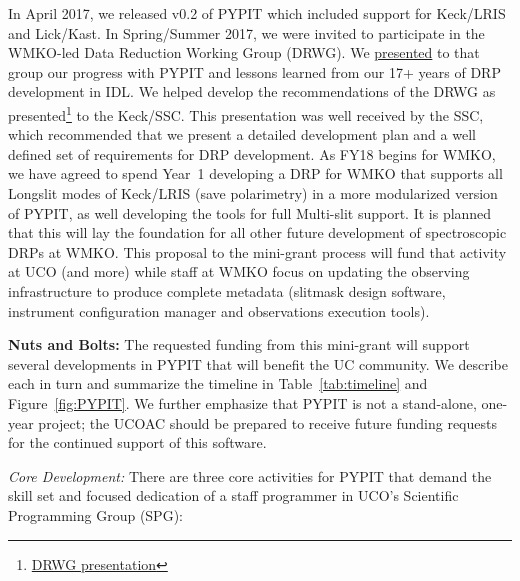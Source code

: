 \documentclass[12pt,preprint]{aastex}
\begin{document}
\noindent
In April 2017, we released v0.2 of PYPIT which included 
support for Keck/LRIS and Lick/Kast. 
In Spring/Summer 2017, we were invited to participate
in the WMKO-led Data Reduction Working Group (DRWG). We 
\href{https://www.dropbox.com/s/n17il1aah1xs6fx/ucsc_pypit_mar2017.pdf?dl=0}
{presented} to that group our progress with PYPIT and
lessons learned from our 17+ years of DRP development in 
IDL.%
We helped develop the recommendations of the DRWG as 
presented\footnote{\href{https://www.dropbox.com/s/k7ykp80voslaw7o/DRWG_June2017_SSC_v2.pptx?dl=0}{DRWG presentation}} 
to the Keck/SSC.  This presentation was well received by the
SSC, which recommended that we present a detailed development plan and a well defined set of requirements for DRP development.  As FY18 begins for WMKO,
we have agreed to spend Year~1 developing a DRP for WMKO
that supports all Longslit modes of Keck/LRIS (save polarimetry)
in a more modularized version of PYPIT, as well developing the
tools for full Multi-slit support. It is planned that this
will lay the foundation for all other future development of
spectroscopic DRPs at WMKO.
This proposal to the mini-grant process will fund
that activity at UCO (and more) while staff at WMKO
focus on updating the observing infrastructure to produce complete metadata (slitmask design software, instrument configuration manager and observations execution tools).%



\noindent 
{\bf Nuts and Bolts:} 
The requested funding from this mini-grant will support
several developments in PYPIT that will benefit the UC
community.  We describe each in turn and summarize the
timeline in Table~\ref{tab:timeline} and Figure~\ref{fig:PYPIT}.
We further emphasize that PYPIT is not a stand-alone,
one-year project;
the UCOAC should be prepared to receive future funding 
requests for the continued support of this software.



\noindent 
{\it Core Development:} 
There are three core activities for PYPIT that demand the
skill set and focused dedication of a staff programmer
in UCO's Scientific Programming Group (SPG):
\end{document}
